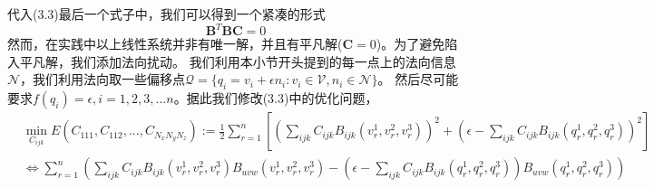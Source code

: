 代入(3.3)最后一个式子中，我们可以得到一个紧凑的形式
$$\mathbf{B}^T \mathbf{B} \mathbf{C} = 0$$
然而，在实践中以上线性系统并非有唯一解，并且有平凡解($\mathbf{C} = 0$)。为了避免陷入平凡解，我们添加法向扰动。
我们利用本小节开头提到的每一点上的法向信息$\mathcal{N}$，我们利用法向取一些偏移点$\mathcal{Q} = \{q_i = v_i + \epsilon n_i: v_i \in \mathcal{V}, n_i \in \mathcal{N}\}$。
然后尽可能要求$f(q_i) = \epsilon, i = 1,2,3,...n$。据此我们修改(3.3)中的优化问题，
\begin{equation}
    \begin{split}
        &\min_{C_{ijk}}E(C_{111},C_{112},...,C_{N_xN_yN_z}):= \frac{1}{2}\sum_{r = 1}^{n} [ (\sum_{ijk}C_{ijk}B_{ijk}(v_r^1,v_r^2,v_r^3))^2 + (\epsilon - \sum_{ijk}C_{ijk}B_{ijk}(q_r^1,q_r^2,q_r^3))^2]\\
        &\Leftrightarrow \sum_{r = 1}^n (\sum_{ijk}C_{ijk} B_{ijk}(v_r^1,v_r^2,v_r^3)B_{uvw}(v_r^1,v_r^2,v_r^3) - ( \epsilon - \sum_{ijk} C_{ijk}B_{ijk}(q_r^1,q_r^2,q_r^3) )B_{uvw}(q_r^1,q_r^2,q_r^3))\\
    \end{split}
\end{equation}

